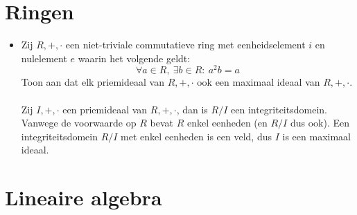 \documentclass[main.tex]{subfiles}
\begin{document}
\section{Ringen}
\label{sec:ringen}

\begin{itemize}
\item Zij $R,+,\cdot$ een niet-triviale commutatieve ring met eenheidselement $i$ en nulelement $e$ waarin het volgende geldt:
  \[ \forall a\in R,\ \exists b\in R:\ a^{2}b=a \]
  Toon aan dat elk priemideaal van $R,+,\cdot$ ook een maximaal ideaal van $R,+,\cdot$.\\\\
  Zij $I,+,\cdot$ een priemideaal van $R,+,\cdot$, dan is $R/I$ een integriteitsdomein.
  Vanwege de voorwaarde op $R$ bevat $R$ enkel eenheden (en $R/I$ dus ook).
  Een integriteitsdomein $R/I$ met enkel eenheden is een veld, dus $I$ is een maximaal ideaal.
\end{itemize}


\section{Lineaire algebra}
\label{sec:lineaire-algebra}
\end{document}
